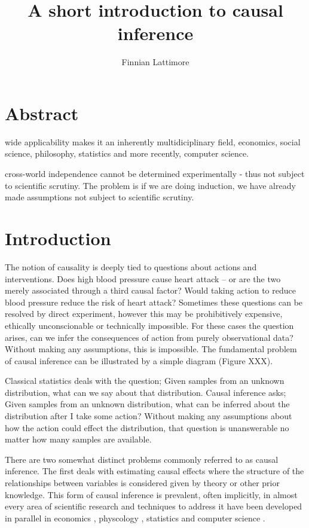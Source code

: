 \documentclass[11pt,a4paper]{article}
\author{Finnian Lattimore}
\title{A short introduction to causal inference}
\begin{document}
\section{Abstract}
wide applicability makes it an inherently multidiciplinary field, economics, social science, philosophy, statistics and more recently, computer science.

cross-world independence cannot be determined experimentally - thus not subject to scientific scrutiny. The problem is if we are doing induction, we have already made assumptions not subject to scientific scrutiny. 
\section*{Introduction}



The notion of causality is deeply tied to questions about actions and interventions. Does high blood pressure cause heart attack – or are the two merely associated through a third causal factor? Would taking action to reduce blood pressure reduce the risk of heart attack? Sometimes these questions can be resolved by direct experiment, however this may be prohibitively expensive, ethically unconscionable or technically impossible. For these cases the question arises, can we infer the consequences of action from purely observational data? Without making any assumptions, this is impossible. The fundamental problem of causal inference can be illustrated by a simple diagram (Figure XXX). 

Classical statistics deals with the question; Given samples from an unknown distribution, what can we say about that distribution. Causal inference asks; Given samples from an unknown distribution, what can be inferred about the distribution after I take some action? Without making any assumptions about how the action could effect the distribution, that question is unanswerable no matter how many samples are available. 

There are two somewhat distinct problems commonly referred to as causal inference. The first deals with estimating causal effects where the structure of the relationships between variables is considered given by theory or other prior knowledge. This form of causal inference is prevalent, often implicitly, in almost every area of scientific research and techniques to address it have been developed in parallel in economics \cite{Heckman}, physcology \cite{Campbell}, statistics \cite{Rubin} and computer science \cite{Pearl}. 
\end{document}
